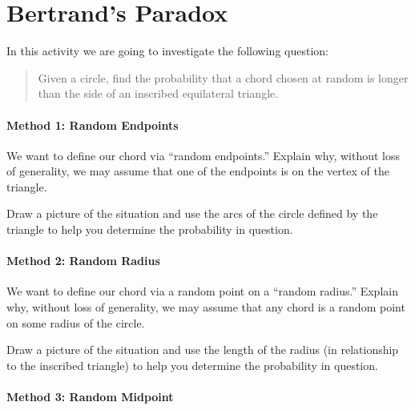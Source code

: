 \newpage
\section{Bertrand's Paradox}

In this activity we are going to investigate the following question:

\begin{quote}
Given a circle, find the probability that a chord chosen at random is longer than the side of an inscribed equilateral triangle. 
\end{quote}

\paragraph{Method 1: Random Endpoints}

\begin{prob}
We want to define our chord via ``random endpoints.'' Explain why,
without loss of generality, we may assume that one of the endpoints is
on the vertex of the triangle.
\end{prob}

\begin{prob}
Draw a picture of the situation and use the arcs of the circle defined
by the triangle to help you determine the probability in question.
\end{prob}




\paragraph{Method 2: Random Radius}

\begin{prob}
We want to define our chord via a random point on a ``random radius.''
Explain why, without loss of generality, we may assume that any chord
is a random point on some radius of the circle.
\end{prob}

\begin{prob}
Draw a picture of the situation and use the length of the radius (in
relationship to the inscribed triangle) to help you determine the
probability in question.
\end{prob}


\paragraph{Method 3: Random Midpoint}

